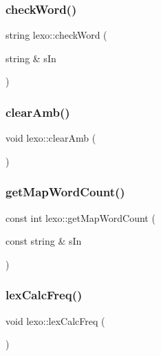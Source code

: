 \mbox{\label{classlexo_a34c8664aad660450936c6fd3f7b235b0}} 
\subsubsection{\texorpdfstring{check\+Word()}{checkWord()}}
{\footnotesize\ttfamily string lexo\+::check\+Word (\begin{DoxyParamCaption}\item[{string \&}]{s\+In }\end{DoxyParamCaption})}

\mbox{\label{classlexo_a90e76d7e93c55b874f92d35375a7b9e6}} 
\subsubsection{\texorpdfstring{clear\+Amb()}{clearAmb()}}
{\footnotesize\ttfamily void lexo\+::clear\+Amb (\begin{DoxyParamCaption}{ }\end{DoxyParamCaption})}

\mbox{\label{classlexo_a8d65ae4edf561a3e402197163a7f8ebb}} 
\subsubsection{\texorpdfstring{get\+Map\+Word\+Count()}{getMapWordCount()}}
{\footnotesize\ttfamily const int lexo\+::get\+Map\+Word\+Count (\begin{DoxyParamCaption}\item[{const string \&}]{s\+In }\end{DoxyParamCaption})}

\mbox{\label{classlexo_a17c552c5bd0d48a836711dc0716e79ee}} 
\subsubsection{\texorpdfstring{lex\+Calc\+Freq()}{lexCalcFreq()}}
{\footnotesize\ttfamily void lexo\+::lex\+Calc\+Freq (\begin{DoxyParamCaption}{ }\end{DoxyParamCaption})}

